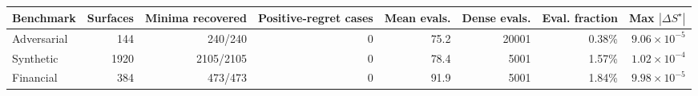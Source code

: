 \begin{tabular}{lrrrrrrr}
\toprule
Benchmark & Surfaces & Minima recovered & Positive-regret cases & Mean evals. & Dense evals. & Eval. fraction & Max $|\Delta S^\star|$ \\
\midrule
Adversarial & 144 & 240/240 & 0 & 75.2 & 20001 & 0.38\% & $9.06\times 10^{-5}$ \\
Synthetic & 1920 & 2105/2105 & 0 & 78.4 & 5001 & 1.57\% & $1.02\times 10^{-4}$ \\
Financial & 384 & 473/473 & 0 & 91.9 & 5001 & 1.84\% & $9.98\times 10^{-5}$ \\
\bottomrule
\end{tabular}
